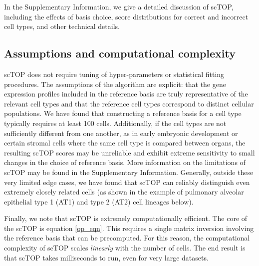 \documentclass[vruler,JEB]{COB}%
\begin{document}
 In the Supplementary Information, we give a detailed discussion of scTOP, including the effects of basis choice, score distributions for correct and incorrect cell types, and other technical details.


\subsection{Assumptions and computational complexity}

scTOP does not require tuning of hyper-parameters or statistical fitting procedures. The assumptions of the algorithm are explicit: that the gene expression profiles included in the reference basis are truly representative of the relevant cell types and that the reference cell types correspond to distinct cellular populations. We have found that constructing a reference basis for a cell type typically requires at least 100 cells. Additionally, if the cell types are not sufficiently different from one another, as in early embryonic development or certain stromal cells where the same cell type is compared between organs, the resulting scTOP scores may be unreliable and exhibit extreme sensitivity to small changes in the choice of reference basis. More information on the limitations of scTOP may be found in the Supplementary Information. Generally, outside these very limited edge cases, we have found that scTOP can reliably distinguish even extremely closely related cells (as shown in the example of pulmonary alveolar epithelial type 1 (AT1) and type 2 (AT2) cell lineages below).

Finally, we note that scTOP is extremely computationally efficient. The core of the scTOP is equation \ref{op_eqn}. This requires a single matrix inversion involving the reference basis that can be precomputed. For this reason, the computational complexity of scTOP scales \emph{linearly} with the number of cells. The end result is that scTOP takes milliseconds to run, even for very large datasets. 

\vfill\eject


\end{document}
